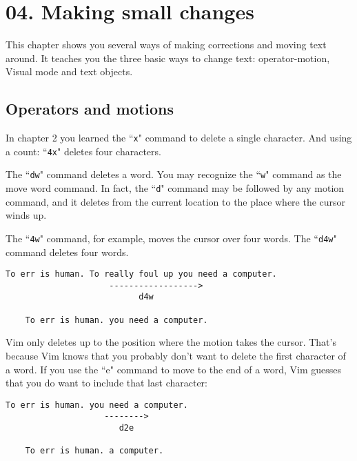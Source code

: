 \section{04. Making small changes}
This chapter shows you several ways of making corrections and moving text
around.  It teaches you the three basic ways to change text: operator-motion,
Visual mode and text objects.
\localtableofcontents
\subsection{Operators and motions}

In chapter 2 you learned the ``\texttt{x}" command to delete a single character.
And using a count: ``\texttt{4x}" deletes four characters.

The ``\texttt{dw}" command deletes a word.
You may recognize the ``\texttt{w}" command as the move word command.
In fact, the ``\texttt{d}" command may be followed by any motion command, and it deletes from the current location to the place where the cursor winds up.

The ``\texttt{4w}" command, for example, moves the cursor over four words.
The ``\texttt{d4w}" command deletes four words.

\begin{Verbatim}[samepage=true]
    To err is human. To really foul up you need a computer. 
                     ------------------>
                           d4w

    To err is human. you need a computer. 
\end{Verbatim}

Vim only deletes up to the position where the motion takes the cursor.
That's because Vim knows that you probably don't want to delete the first character of a word.
If you use the ``e" command to move to the end of a word, Vim guesses that you do want to include that last character:

\begin{Verbatim}[samepage=true]
    To err is human. you need a computer. 
                    -------->
                       d2e

    To err is human. a computer. 
\end{Verbatim}

